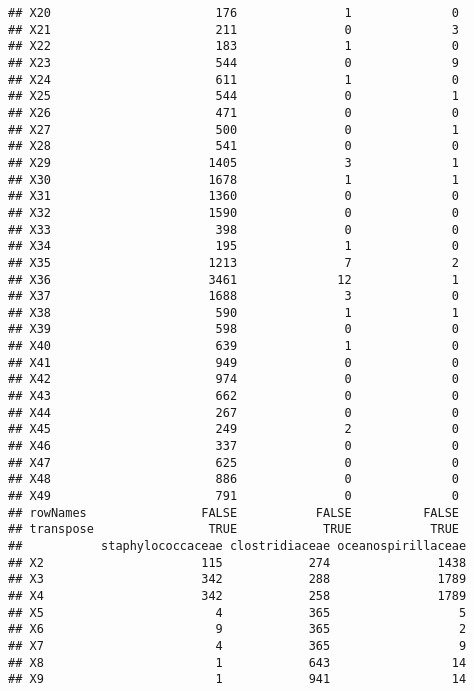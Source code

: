 \documentclass[12pt]{beamer}\usepackage[]{graphicx}\usepackage[]{color}
\makeatletter
\newenvironment{kframe}{%
 \def\at@end@of@kframe{}%
 \ifinner\ifhmode%
  \def\at@end@of@kframe{\end{minipage}}%
  \begin{minipage}{\columnwidth}%
 \fi\fi%
 \def\FrameCommand##1{\hskip\@totalleftmargin \hskip-\fboxsep
 \colorbox{shadecolor}{##1}\hskip-\fboxsep
     \hskip-\linewidth \hskip-\@totalleftmargin \hskip\columnwidth}%
 \MakeFramed {\advance\hsize-\width
   \@totalleftmargin\z@ \linewidth\hsize
   \@setminipage}}%
 {\par\unskip\endMakeFramed%
 \at@end@of@kframe}
\newenvironment{knitrout}{}{} %
\makeatother
\begin{document}
\begin{frame}[fragile]
\begin{knitrout}
\begin{kframe}
\begin{verbatim}
## X20                       176               1              0
## X21                       211               0              3
## X22                       183               1              0
## X23                       544               0              9
## X24                       611               1              0
## X25                       544               0              1
## X26                       471               0              0
## X27                       500               0              1
## X28                       541               0              0
## X29                      1405               3              1
## X30                      1678               1              1
## X31                      1360               0              0
## X32                      1590               0              0
## X33                       398               0              0
## X34                       195               1              0
## X35                      1213               7              2
## X36                      3461              12              1
## X37                      1688               3              0
## X38                       590               1              1
## X39                       598               0              0
## X40                       639               1              0
## X41                       949               0              0
## X42                       974               0              0
## X43                       662               0              0
## X44                       267               0              0
## X45                       249               2              0
## X46                       337               0              0
## X47                       625               0              0
## X48                       886               0              0
## X49                       791               0              0
## rowNames                FALSE           FALSE          FALSE
## transpose                TRUE            TRUE           TRUE
##           staphylococcaceae clostridiaceae oceanospirillaceae
## X2                      115            274               1438
## X3                      342            288               1789
## X4                      342            258               1789
## X5                        4            365                  5
## X6                        9            365                  2
## X7                        4            365                  9
## X8                        1            643                 14
## X9                        1            941                 14

\end{verbatim}
\end{kframe}
\end{knitrout}
\end{frame}
\end{document}
